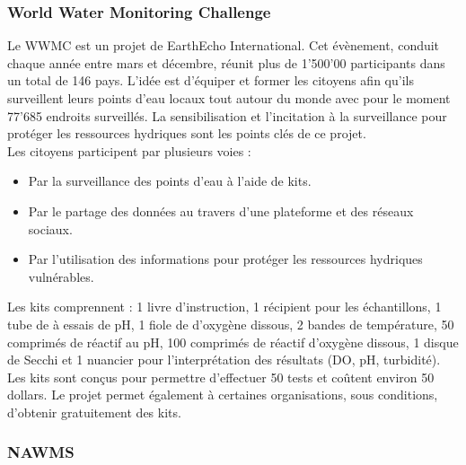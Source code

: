 \documentclass[10pt, conference, compsocconf]{llncs}
\begin{document}
		\subsubsection{World Water Monitoring Challenge}
			Le WWMC est un projet de EarthEcho International. Cet évènement, conduit chaque année entre mars et décembre, réunit plus de 1'500'00 participants dans un total de 146 pays. L'idée est d'équiper et former les citoyens afin qu'ils surveillent leurs points d'eau locaux tout autour du monde avec pour le moment 77'685 endroits surveillés. La sensibilisation et l'incitation à la surveillance pour protéger les ressources hydriques sont les points clés de ce projet. \\
			Les citoyens participent par plusieurs voies :
			\begin{itemize}
				\item Par la surveillance des points d'eau à l'aide de kits.
				\item Par le partage des données au travers d'une plateforme et des réseaux sociaux.
				\item Par l'utilisation des informations pour protéger les ressources hydriques vulnérables. 
			\end{itemize}
			Les kits comprennent : 1 livre d'instruction, 1 récipient pour les échantillons, 1 tube de à essais de pH, 1 fiole de d'oxygène dissous, 2 bandes de température, 50 comprimés de réactif au pH, 100 comprimés de réactif d'oxygène dissous, 1 disque de Secchi et 1 nuancier pour l'interprétation des résultats (DO, pH, turbidité). Les kits sont conçus pour permettre d'effectuer 50 tests et coûtent environ 50 dollars. Le projet permet également à certaines organisations, sous conditions, d'obtenir gratuitement des kits.
		
		\subsubsection{NAWMS}
		
\end{document}
